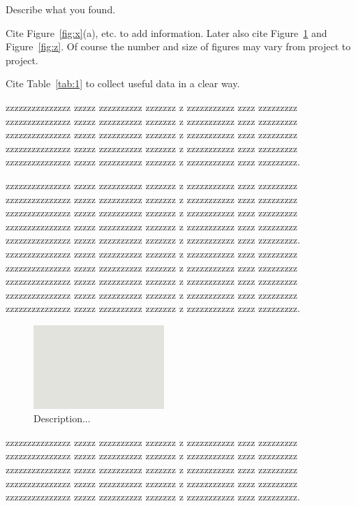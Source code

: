 \documentclass[prl,twocolumn]{revtex4-1}
\begin{document}
Describe what you found.

Cite Figure~\ref{fig:x}(a), etc. to add information. Later also cite Figure~\ref{fig:y} and  Figure~\ref{fig:z}. Of course the number and size of figures may vary from project to project.

Cite Table~\ref{tab:1} to collect useful data in a clear way.

  zzzzzzzzzzzzzzz zzzzz zzzzzzzzzz zzzzzzz z zzzzzzzzzzz zzzz zzzzzzzzz
  zzzzzzzzzzzzzzz zzzzz zzzzzzzzzz zzzzzzz z zzzzzzzzzzz zzzz zzzzzzzzz
  zzzzzzzzzzzzzzz zzzzz zzzzzzzzzz zzzzzzz z zzzzzzzzzzz zzzz zzzzzzzzz
  zzzzzzzzzzzzzzz zzzzz zzzzzzzzzz zzzzzzz z zzzzzzzzzzz zzzz zzzzzzzzz
  zzzzzzzzzzzzzzz zzzzz zzzzzzzzzz zzzzzzz z zzzzzzzzzzz zzzz zzzzzzzzz.

  zzzzzzzzzzzzzzz zzzzz zzzzzzzzzz zzzzzzz z zzzzzzzzzzz zzzz zzzzzzzzz
  zzzzzzzzzzzzzzz zzzzz zzzzzzzzzz zzzzzzz z zzzzzzzzzzz zzzz zzzzzzzzz
  zzzzzzzzzzzzzzz zzzzz zzzzzzzzzz zzzzzzz z zzzzzzzzzzz zzzz zzzzzzzzz
  zzzzzzzzzzzzzzz zzzzz zzzzzzzzzz zzzzzzz z zzzzzzzzzzz zzzz zzzzzzzzz
  zzzzzzzzzzzzzzz zzzzz zzzzzzzzzz zzzzzzz z zzzzzzzzzzz zzzz zzzzzzzzz.
  zzzzzzzzzzzzzzz zzzzz zzzzzzzzzz zzzzzzz z zzzzzzzzzzz zzzz zzzzzzzzz
  zzzzzzzzzzzzzzz zzzzz zzzzzzzzzz zzzzzzz z zzzzzzzzzzz zzzz zzzzzzzzz
  zzzzzzzzzzzzzzz zzzzz zzzzzzzzzz zzzzzzz z zzzzzzzzzzz zzzz zzzzzzzzz
  zzzzzzzzzzzzzzz zzzzz zzzzzzzzzz zzzzzzz z zzzzzzzzzzz zzzz zzzzzzzzz
  zzzzzzzzzzzzzzz zzzzz zzzzzzzzzz zzzzzzz z zzzzzzzzzzz zzzz zzzzzzzzz.
  
\begin{figure}[!tb]
  \includegraphics[width=0.44\textwidth]{fig1a.png}
  \caption{Description...}
  \label{fig:y}
\end{figure}

  zzzzzzzzzzzzzzz zzzzz zzzzzzzzzz zzzzzzz z zzzzzzzzzzz zzzz zzzzzzzzz
  zzzzzzzzzzzzzzz zzzzz zzzzzzzzzz zzzzzzz z zzzzzzzzzzz zzzz zzzzzzzzz
  zzzzzzzzzzzzzzz zzzzz zzzzzzzzzz zzzzzzz z zzzzzzzzzzz zzzz zzzzzzzzz
  zzzzzzzzzzzzzzz zzzzz zzzzzzzzzz zzzzzzz z zzzzzzzzzzz zzzz zzzzzzzzz
  zzzzzzzzzzzzzzz zzzzz zzzzzzzzzz zzzzzzz z zzzzzzzzzzz zzzz zzzzzzzzz.
\end{document}
